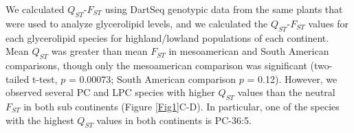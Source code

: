 \documentclass[9pt,twocolumn,twoside,lineno]{BioRxiv}
\begin{document}
We calculated $Q_{ST}$-$F_{ST}$ using DartSeq genotypic data from the same plants that were used to analyze glycerolipid levels, and we calculated the $Q_{ST}$-$F_{ST}$ values for each glycerolipid species for highland/lowland populations of each continent. 
Mean $Q_{ST}$ was greater than mean $F_{ST}$ in mesoamerican and South American comparisons, though only the mesoamerican comparison was significant (two-tailed t-test, $p$ = 0.00073; South American comparison $p$ = 0.12).
However, we observed several PC and LPC species with higher $Q_{ST}$ values than the neutral $F_{ST}$ in both sub continents (Figure \ref{Fig1}C-D).
In particular, one of the species with the highest $Q_{ST}$ values in both continents is PC-36:5. 
%
\end{document}
